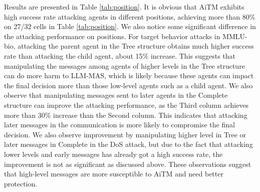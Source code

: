 Results are presented in Table \ref{tab:position}. It is obvious that AiTM exhibits high success rate attacking agents in different positions, achieving more than 80\% on 27/32 cells in Table \ref{tab:position}. We also notice some significant difference in the attacking performance on positions. For target behavior attacks in MMLU-bio, attacking the parent agent in the Tree structure obtains much higher success rate than attacking the child agent, about 15\% increase. This suggests that manipulating the messages among agents of higher levels in the Tree structure can do more harm to LLM-MAS, which is likely because these agents can impact the final decision more than those low-level agents such as a child agent. We also observe that manipulating messages sent to later agents in the Complete structure can improve the attacking performance, as the Third column achieves more than 30\% increase than the Second column. This indicates that attacking later messages in the communication is more likely to compromise the final decision. We also observe improvement by manipulating higher level in Tree or later messages in Complete in the DoS attack, but due to the fact that attacking lower levels and early messages has already got a high success rate, the improvement is not as significant as discussed above. These observations suggest that high-level messages are more susceptible to AiTM and need better protection.

